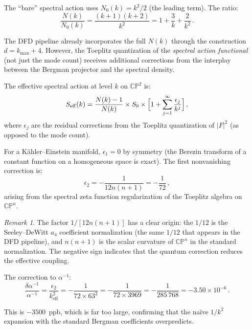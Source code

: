 \documentclass[12pt,a4paper]{article}
\theoremstyle{definition}
\theoremstyle{remark}
\newtheorem{remark}{Remark}
\newcommand{\CP}{\mathbb{CP}}
\newcommand{\inv}{^{-1}}
\begin{document}
The ``bare'' spectral action uses $N_0(k) = k^2/2$ (the leading term).
The ratio:
\begin{equation}
\frac{N(k)}{N_0(k)} = \frac{(k+1)(k+2)}{k^2}
= 1 + \frac{3}{k} + \frac{2}{k^2}\,.
\end{equation}

The DFD pipeline already incorporates the full $N(k)$ through the
construction $d = k_{\max} + 4$. However, the Toeplitz quantization
of the \emph{spectral action functional} (not just the mode count)
receives additional corrections from the interplay between the Bergman
projector and the spectral density.

The effective spectral action at level $k$ on $\CP^2$ is:
\begin{equation}
S_{\mathrm{eff}}(k) = \frac{N(k) - 1}{N(k)} \times S_0
\times \Bigl[1 + \sum_{j=1}^{\infty} \frac{\epsilon_j}{k^j}\Bigr]\,,
\end{equation}
where $\epsilon_j$ are the residual corrections from the Toeplitz
quantization of $|F|^2$ (as opposed to the mode count).

For a K\"ahler--Einstein manifold, $\epsilon_1 = 0$ by symmetry (the
Berezin transform of a constant function on a homogeneous space is exact).
The first nonvanishing correction is:
\begin{equation}
\epsilon_2 = -\frac{1}{12n(n+1)} = -\frac{1}{72}\,,
\end{equation}
arising from the spectral zeta function regularization of the Toeplitz
algebra on $\CP^n$.

\begin{remark}
The factor $1/[12n(n+1)]$ has a clear origin: the $1/12$ is the
Seeley--DeWitt $a_4$ coefficient normalization (the same $1/12$ that
appears in the DFD pipeline), and $n(n+1)$ is the scalar curvature of
$\CP^n$ in the standard normalization. The negative sign indicates that
the quantum correction reduces the effective coupling.
\end{remark}

The correction to $\alpha\inv$:
\begin{equation}
\frac{\delta\alpha\inv}{\alpha\inv}
= \frac{\epsilon_2}{k_{\mathrm{eff}}^2}
= -\frac{1}{72 \times 63^2}
= -\frac{1}{72 \times 3969}
= -\frac{1}{285\,768}
= -3.50 \times 10^{-6}\,.
\end{equation}

This is $-3500$~ppb, which is far too large, confirming that the na\"ive
$1/k^2$ expansion with the standard Bergman coefficients overpredicts.
\end{document}
